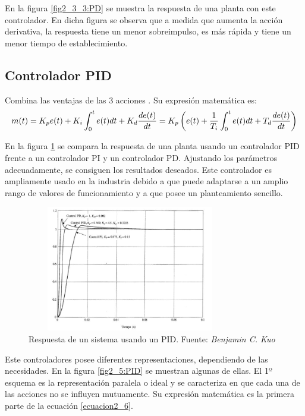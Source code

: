 	En la figura \ref{fig2_3_3:PD} se muestra la respuesta de una planta con este controlador. En dicha figura se observa que a medida que aumenta la acción derivativa, la respuesta tiene un menor sobreimpulso, es más rápida y tiene un menor tiempo de establecimiento. 

\subsection{Controlador PID}
	Combina las ventajas de las 3 acciones . Su expresión matemática es:
\begin{equation}\label{ecuacion2_6}
\normalsize m(t) =K_{p}e(t) + K_{i}\int _0^t e(t) dt + K_{d}\frac{de(t)}{dt} =  K_{p}\left( e(t) + \frac{1}{T_{i}} \int _0^t e(t) dt + T_{d}\frac{de(t)}{dt}\right)
\end{equation}

	En la figura \ref{fig2_4:PID} se compara la respuesta de una planta usando un controlador PID frente a un controlador PI y un controlador PD. Ajustando los parámetros adecuadamente, se consiguen los resultados deseados. Este controlador es ampliamente usado en la industria debido a que puede adaptarse a un amplio rango de valores de funcionamiento y a que posee un planteamiento sencillo. 

\begin{figure}[htbp]
\centering
\includegraphics[width=90mm,height=55mm]{imagenes/capitulo2/2_4_PID}
\caption {Respuesta de un sistema usando un PID. Fuente: \textit{Benjamin C. Kuo} \cite{control2}}
\label{fig2_4:PID}
\end{figure}

	Este controladores posee diferentes representaciones, dependiendo de las necesidades. En la figura \ref{fig2_5:PID} se muestran algunas de ellas.  El 1º esquema es la representación paralela o ideal y se caracteriza en que cada una de las acciones no se influyen mutuamente. Su expresión matemática es la primera parte de la ecuación \ref{ecuacion2_6}.

